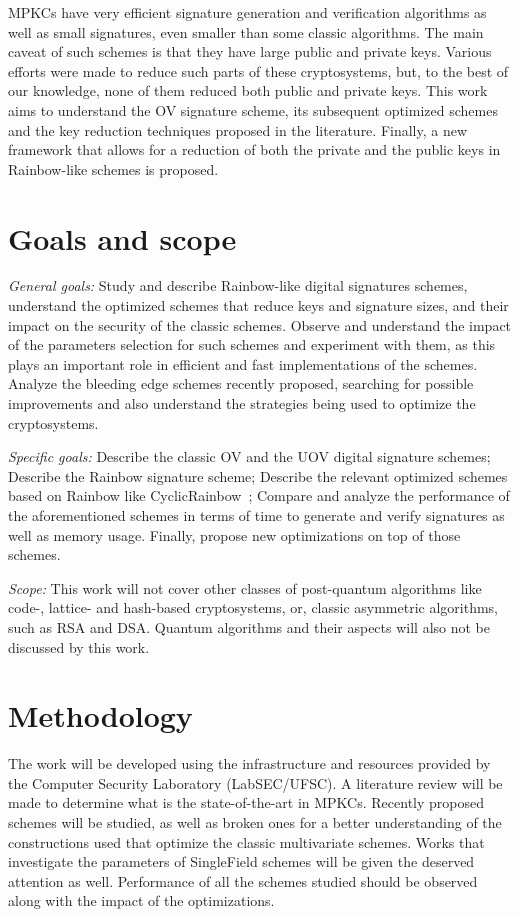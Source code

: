 \documentclass{ufsctex/ufsctex}
\begin{document}
MPKCs have very efficient signature generation and verification algorithms as
well as small signatures, even smaller than some classic algorithms. The main
caveat of such schemes is that they have large public and private keys. Various
efforts were made to reduce such parts of these cryptosystems, but, to the best
of our knowledge, none of them reduced both public and private keys. This work
aims to understand the OV signature scheme, its subsequent optimized schemes
and the key reduction techniques proposed in the literature. Finally, a new
framework that allows for a reduction of both the private and the public keys
in Rainbow-like schemes is proposed.

\section{Goals and scope}

\textit{General goals:} Study and describe Rainbow-like digital signatures
schemes, understand the optimized schemes that reduce keys and signature sizes,
and their impact on the security of the classic schemes. Observe and understand
the impact of the parameters selection for such schemes and experiment with
them, as this plays an important role in efficient and fast implementations of
the schemes. Analyze the bleeding edge schemes recently proposed, searching for
possible improvements and also understand the strategies being used to optimize
the cryptosystems.

\textit{Specific goals:} Describe the classic OV and the UOV digital signature
schemes; Describe the Rainbow signature scheme; Describe the relevant optimized
schemes based on Rainbow like CyclicRainbow~\cite{petzoldt2010cyclicrainbow};
Compare and analyze the performance of the aforementioned schemes in terms of
time to generate and verify signatures as well as memory usage. Finally,
propose new optimizations on top of those schemes.

\textit{Scope:} This work will not cover other classes of post-quantum
algorithms like code-, lattice- and hash-based cryptosystems, or, classic
asymmetric algorithms, such as RSA and DSA. Quantum algorithms and their
aspects will also not be discussed by this work.

\section{Methodology}

The work will be developed using the infrastructure and resources provided by
the Computer Security Laboratory (LabSEC/UFSC). A literature review will be
made to determine what is the state-of-the-art in MPKCs. Recently proposed
schemes will be studied, as well as broken ones for a better understanding of
the constructions used that optimize the classic multivariate schemes. Works
that investigate the parameters of SingleField schemes will be given the
deserved attention as well. Performance of all the schemes studied should be
observed along with the impact of the optimizations.
\end{document}
